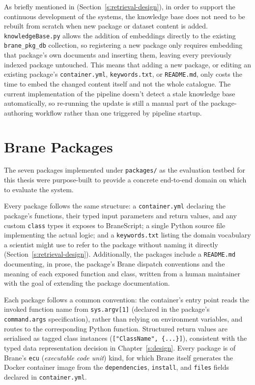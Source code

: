 As briefly mentioned in (Section~\ref{s:retrieval-design}), in order to support the 
continuous development of the systems, the knowledge base does not need
to be rebuilt from scratch when new package or dataset content is added.
\texttt{knowledgeBase.py} allows the addition of embeddings directly to the existing \texttt{brane\_pkg\_db}
collection, so registering a new package only requires embedding that
package's own documents and inserting them, leaving every previously
indexed package untouched. This means that adding a new
package, or editing an existing package's \texttt{container.yml},
\texttt{keywords.txt}, or \texttt{README.md}, only costs the time to embed
the changed content itself and not the whole catalogue. 
The current implementation of the pipeline doesn't detect a stale knowledge base automatically, so re-running the
update is still a manual part of the package-authoring workflow rather
than one triggered by pipeline startup.

\section{Brane Packages}\label{s:brane-packages}

The seven packages implemented under \texttt{packages/} as the evaluation
testbed for this thesis were purpose-built to provide a concrete end-to-end
domain on which to evaluate the system.

Every package follows the same structure: a \texttt{container.yml}
declaring the package's functions, their typed input parameters and return values,
and any custom \texttt{class} types it exposes to BraneScript; a single
Python source file implementing the actual logic; and a \texttt{keywords.txt}
listing the domain vocabulary a scientist might use to refer to the package
without naming it directly (Section~\ref{s:retrieval-design}). Additionally,
the packages include a \texttt{README.md} documenting, in
prose, the package's Brane dispatch conventions and the meaning of each
exposed function and class, written from a human maintainer with the goal of extending the package documentation.

Each package follows a common convention: the
container's entry point reads the invoked function name from
\texttt{sys.argv[1]} (declared in the package's \texttt{command.args}
specification), rather than relying on environment variables, and routes to
the corresponding Python function. Structured return values are serialised as
tagged class instances (\texttt{["ClassName", \{...\}]}), consistent with the
typed data representation decision in Chapter~\ref{s:design}. Every package is
of Brane's \texttt{ecu} (\emph{executable code unit}) kind, for which Brane
itself generates the Docker container image from the \texttt{dependencies},
\texttt{install}, and \texttt{files} fields declared in
\texttt{container.yml}.

